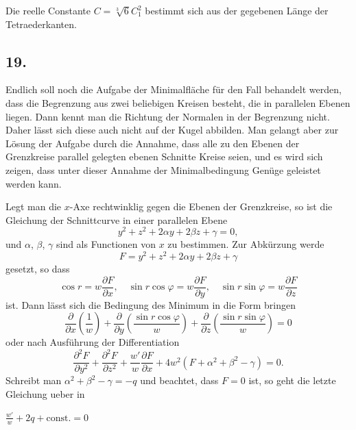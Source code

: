 \documentclass[12pt,a4paper]{article}
\begin{document}
Die reelle Constante $C = \sqrt[3]{6} C_{1}^{2}$ bestimmt sich aus der gegebenen L\"ange der Tetraederkanten.

\subsection*{19.}

Endlich soll noch die Aufgabe der Minimalfl\"ache f\"ur den Fall behandelt werden, dass die Begrenzung aus zwei beliebigen Kreisen besteht, die in parallelen Ebenen liegen. Dann kennt man die Richtung der Normalen in der Begrenzung nicht. Daher l\"asst sich diese auch nicht auf der Kugel abbilden. Man gelangt aber zur L\"osung der Aufgabe durch die Annahme, dass alle zu den Ebenen der Grenzkreise parallel gelegten ebenen Schnitte Kreise seien, und es wird sich zeigen, dass unter dieser Annahme der Minimalbedingung Gen\"uge geleistet werden kann.

Legt man die $x$-Axe rechtwinklig gegen die Ebenen der Grenzkreise, so ist die Gleichung der Schnittcurve in einer parallelen Ebene
\[y^{2} + z^{2} + 2\alpha y + 2\beta z + \gamma = 0,\]
und $\alpha$, $\beta$, $\gamma$ sind als Functionen von $x$ zu bestimmen. Zur Abk\"urzung werde
\[F = y^{2} + z^{2} + 2\alpha y + 2\beta z + \gamma\]
gesetzt, so dass
\[\cos r = w \frac{\partial F}{\partial x}, \quad \sin r \cos\varphi = w \frac{\partial F}{\partial y}, \quad \sin r \sin\varphi = w \frac{\partial F}{\partial z}\]
ist. Dann l\"asst sich die Bedingung des Minimum in die Form bringen
\[\frac{\partial}{\partial x} \left(\frac{1}{w}\right) + \frac{\partial}{\partial y} \left(\frac{\sin r \cos\varphi}{w}\right) + \frac{\partial}{\partial z} \left(\frac{\sin r \sin\varphi}{w}\right) = 0\]
oder nach Ausf\"uhrung der Differentiation
\[\frac{\partial^{2}F}{\partial y^{2}} + \frac{\partial^{2}F}{\partial z^{2}} + \frac{w'}{w} \frac{\partial F}{\partial x} + 4w^{2}(F + \alpha^{2} + \beta^{2} - \gamma) = 0.\]
Schreibt man $\alpha^{2} + \beta^{2} - \gamma = -q$ und beachtet, dass $F = 0$ ist, so geht die letzte Gleichung ueber in

\newpage
\noindent $\frac{w'}{w} + 2q + \text{const.} = 0$
\end{document}

